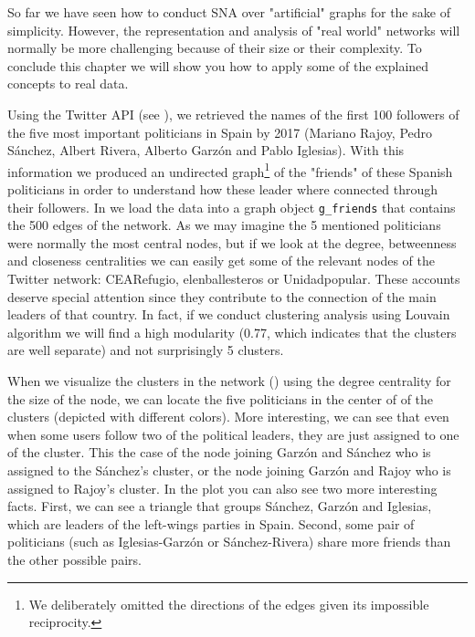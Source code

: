 So far we have seen how to conduct SNA over "artificial" graphs for the sake of simplicity. However, the representation and analysis of "real world" networks will normally be more challenging because of their size or their complexity. To conclude this chapter we will show you how to apply some of the explained concepts to real data.

Using the Twitter API (see ), we retrieved the names of the first 100 followers of the five most important politicians in Spain by 2017 (Mariano Rajoy, Pedro Sánchez, Albert Rivera, Alberto Garzón and Pablo Iglesias). With this information we produced an undirected graph\footnote{We deliberately omitted the directions of the edges given its impossible reciprocity.} of the "friends" of these Spanish politicians in order to understand how these leader where connected through their followers. In  we load the data into a graph object \texttt{g\_friends} that contains the 500 edges of the network. As we may imagine the 5 mentioned politicians were normally the most central nodes, but if we look at the degree, betweenness and closeness centralities we can easily get some of the relevant nodes of the Twitter network: CEARefugio, elenballesteros or Unidadpopular. These accounts deserve special attention since they contribute to the connection of the main leaders of that country. In fact, if we conduct clustering analysis using Louvain algorithm we will find a high modularity (0.77, which indicates that the clusters are well separate) and not surprisingly 5 clusters. 


When we visualize the clusters in the network () using the degree centrality for the size of the node, we can locate the five politicians in the center of of the clusters (depicted with different colors). More interesting, we can see that even when some users follow two of the political leaders, they are just assigned to one of the cluster. This the case of the node joining Garzón and Sánchez who is assigned to the Sánchez's cluster, or the node joining Garzón and Rajoy who is assigned to Rajoy's cluster. In the plot you can also see two more interesting facts. First, we can see a triangle that groups Sánchez, Garzón and Iglesias, which are leaders of the left-wings parties in Spain. Second, some pair of politicians (such as Iglesias-Garzón or Sánchez-Rivera) share more friends than the other possible pairs. 

